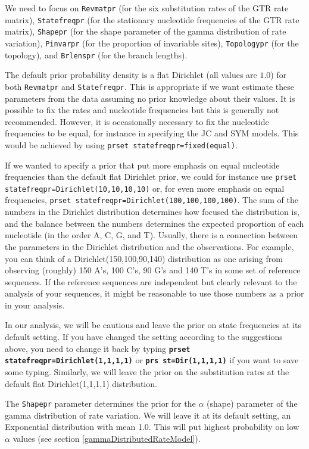 \documentclass[12pt]{book}
\newcommand{\ttt}[1]{\texttt{#1}}
\newcommand{\tb}[1]{\ttt{\textbf{#1}}}
\begin{document}
We need to focus on \texttt{Revmatpr} (for the six substitution rates of the GTR rate matrix),
\texttt{Statefreqpr} (for the stationary nucleotide frequencies of the GTR rate matrix),
\texttt{Shapepr} (for the shape parameter of the gamma distribution of rate variation),
\texttt{Pinvarpr} (for the proportion of invariable sites), \texttt{Topologypr} (for the topology),
and \texttt{Brlenspr} (for the branch lengths).

The default prior probability density is a flat Dirichlet (all values are $1.0$) for both
\texttt{Revmatpr} and \texttt{Statefreqpr}. This is appropriate if we want estimate these
parameters from the data assuming no prior knowledge about their values. It is possible to fix the
rates and nucleotide frequencies but this is generally not recommended. However, it is occasionally
necessary to fix the nucleotide frequencies to be equal, for instance in specifying the JC and SYM
models.  This would be achieved by using \texttt{prset statefreqpr=fixed(equal)}.

If we wanted to specify a prior that put more emphasis on equal nucleotide frequencies than the
default flat Dirichlet prior, we could for instance use \texttt{prset
statefreqpr=Dirichlet(10,10,10,10)} or, for even more emphasis on equal frequencies, \texttt{prset
statefreqpr=Dirichlet(100,100,100,100)}. The sum of the numbers in the Dirichlet distribution
determines how focused the distribution is, and the balance between the numbers determines the
expected proportion of each nucleotide (in the order A, C, G, and T). Usually, there is a
connection between the parameters in the Dirichlet distribution and the observations. For example,
you can think of a Dirichlet(150,100,90,140) distribution as one arising from observing (roughly)
150 A's, 100 C's, 90 G's and 140 T's in some set of reference sequences. If the reference sequences
are independent but clearly relevant to the analysis of your sequences, it might be reasonable to
use those numbers as a prior in your analysis.

In our analysis, we will be cautious and leave the prior on state frequencies at its default
setting. If you have changed the setting according to the suggestions above, you need to change it
back by typing \tb{prset statefreqpr=Dirichlet(1,1,1,1)} or \tb{prs st=Dir(1,1,1,1)} if you want to
save some typing. Similarly, we will leave the prior on the substitution rates at the default flat
Dirichlet(1,1,1,1) distribution.

The \texttt{Shapepr} parameter determines the prior for the $\alpha$ (shape) parameter of the gamma
distribution of rate variation. We will leave it at its default setting, an Exponential
distribution with mean 1.0. This will put highest probability on low $\alpha$ values (see section
\ref{gammaDistributedRateModel}).
\end{document}
